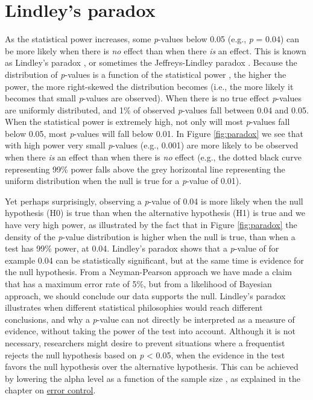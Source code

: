 \documentclass[
]{krantz}
\begin{document}
\hypertarget{lindley}{%
\section{Lindley's paradox}\label{lindley}}

As the statistical power increases, some \emph{p}-values below 0.05 (e.g., \emph{p} = 0.04) can be more likely when there is \emph{no} effect than when there \emph{is} an effect. This is known as Lindley's paradox \citep{lindley_statistical_1957}, or sometimes the Jeffreys-Lindley paradox \citep{spanos_who_2013}. Because the distribution of \emph{p}-values is a function of the statistical power \citep{cumming_replication_2008}, the higher the power, the more right-skewed the distribution becomes (i.e., the more likely it becomes that small \emph{p}-values are observed). When there is no true effect \emph{p}-values are uniformly distributed, and 1\% of observed \emph{p}-values fall between 0.04 and 0.05. When the statistical power is extremely high, not only will most \emph{p}-values fall below 0.05, most \emph{p}-values will fall below 0.01. In Figure \ref{fig:paradox} we see that with high power very small \emph{p}-values (e.g., 0.001) are more likely to be observed when there \emph{is} an effect than when there is \emph{no} effect (e.g., the dotted black curve representing 99\% power falls above the grey horizontal line representing the uniform distribution when the null is true for a \emph{p}-value of 0.01).

Yet perhaps surprisingly, observing a \emph{p}-value of 0.04 is more likely when the null hypothesis (H0) is true than when the alternative hypothesis (H1) is true and we have very high power, as illustrated by the fact that in Figure \ref{fig:paradox} the density of the \emph{p}-value distribution is higher when the null is true, than when a test has 99\% power, at 0.04. Lindley's paradox shows that a \emph{p}-value of for example 0.04 can be statistically significant, but at the same time is evidence for the null hypothesis. From a Neyman-Pearson approach we have made a claim that has a maximum error rate of 5\%, but from a likelihood of Bayesian approach, we should conclude our data supports the null. Lindley's paradox illustrates when different statistical philosophies would reach different conclusions, and why a \emph{p}-value can not directly be interpreted as a measure of evidence, without taking the power of the test into account. Although it is not necessary, researchers might desire to prevent situations where a frequentist rejects the null hypothesis based on \emph{p} \textless{} 0.05, when the evidence in the test favors the null hypothesis over the alternative hypothesis. This can be achieved by lowering the alpha level as a function of the sample size \citep{leamer_specification_1978, maier_justify_2022, good_bayesnon-bayes_1992}, as explained in the chapter on \protect\hyperlink{errorcontrol}{error control}.
\end{document}
